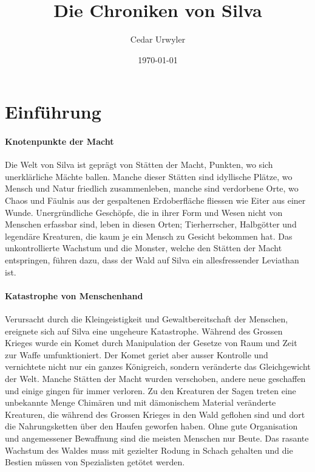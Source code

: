 \documentclass[12pt,twoside,twocolumn,openany]{book}
\title{\chapterfamily Die Chroniken von Silva}
\author{\chapterfamily Cedar Urwyler}
\date{\today}
\begin{document}
\maketitle
\tableofcontents

\chapter{Einführung}
\subsubsection{Knotenpunkte der Macht} Die Welt von Silva ist geprägt von Stätten der Macht, Punkten, wo sich unerklärliche Mächte ballen. Manche dieser Stätten sind idyllische Plätze, wo Mensch und Natur friedlich zusammenleben, manche sind verdorbene Orte, wo Chaos und Fäulnis aus der gespaltenen Erdoberfläche fliessen wie Eiter aus einer Wunde. Unergründliche Geschöpfe, die in ihrer Form und Wesen nicht von Menschen erfassbar sind, leben in diesen Orten; Tierherrscher, Halbgötter und legendäre Kreaturen, die kaum je ein Mensch zu Gesicht bekommen hat. Das unkontrollierte Wachstum und die Monster, welche den Stätten der Macht entspringen, führen dazu, dass der Wald auf Silva ein allesfressender Leviathan ist.
	
\subsubsection{Katastrophe von Menschenhand} Verursacht durch die Kleingeistigkeit und Gewaltbereitschaft der Menschen, ereignete sich auf Silva eine ungeheure Katastrophe. Während des Grossen Krieges wurde ein Komet durch Manipulation der Gesetze von Raum und Zeit zur Waffe umfunktioniert. Der Komet geriet aber ausser Kontrolle und vernichtete nicht nur ein ganzes Königreich, sondern veränderte das Gleichgewicht der Welt. Manche Stätten der Macht wurden verschoben, andere neue geschaffen und einige gingen für immer verloren. Zu den Kreaturen der Sagen treten eine unbekannte Menge Chimären und mit dämonischem Material veränderte Kreaturen, die während des Grossen Krieges in den Wald geflohen sind und dort die Nahrungsketten über den Haufen geworfen haben. Ohne gute Organisation und angemessener Bewaffnung sind die meisten Menschen nur Beute. Das rasante Wachstum des Waldes muss mit gezielter Rodung in Schach gehalten und die Bestien müssen von Spezialisten getötet werden.

\end{document}
